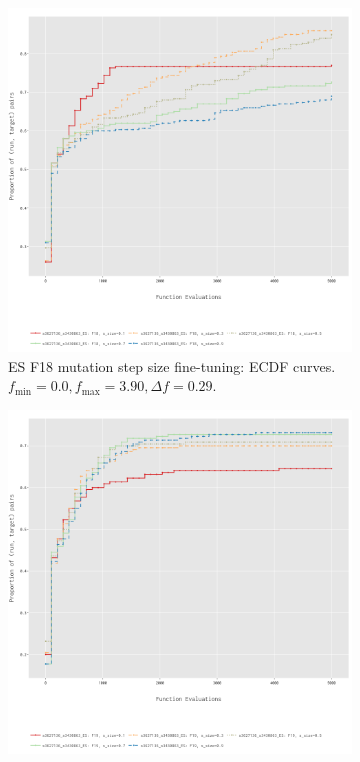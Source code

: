\documentclass{article}
\begin{document}
\begin{figure}[!ht]
    \begin{subfigure}[h]{0.95\linewidth}
        \includegraphics[width=\linewidth]{es/f18/ECDF18ss.png}
        \caption{ES F18 mutation step size fine-tuning: ECDF curves. $f_{\min} = 0.0, f_{\max} = 3.90, \Delta f = 0.29$.}
    \end{subfigure}
    \hfill
    \begin{subfigure}[h]{0.95\linewidth}
        \includegraphics[width=\linewidth]{es/f19/ECDF19ss.png}

\end{subfigure}
\end{figure}
\end{document}
